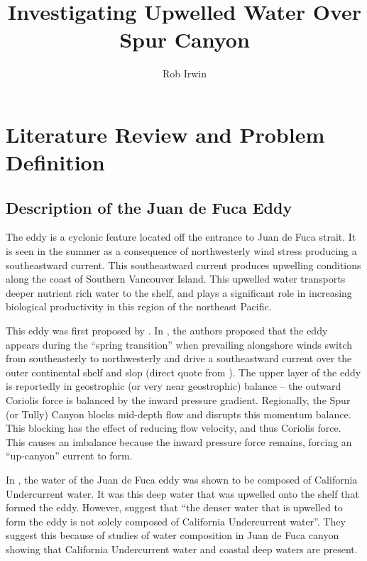 \documentclass[12pt]{extreport}
\title{Investigating Upwelled Water Over Spur Canyon}
\author{Rob Irwin}
\begin{document}
\maketitle

\chapter{Literature Review and Problem Definition}

\section{Description of the Juan de Fuca Eddy}

The eddy is a cyclonic feature located off the entrance to Juan de Fuca strait. It is seen in the summer as a consequence of northwesterly wind stress producing a southeastward current. This southeastward current produces upwelling conditions along the coast of Southern Vancouver Island. This upwelled water transports deeper nutrient rich water to the shelf, and plays a significant role in increasing biological productivity in this region of the northeast Pacific.

This eddy was first proposed by \cite{tully1941surface}. In 
\cite{freeland1982topographically}
, the authors proposed that the eddy appears during the ``spring transition'' when prevailing alongshore winds switch from southeasterly to northwesterly and drive a southeastward current over the outer continental shelf and slop (direct quote from \cite{foreman2008modeling}). The upper layer of the eddy is reportedly in geostrophic (or very near geostrophic) balance -- the outward Coriolis force is balanced by the inward pressure gradient. Regionally, the Spur (or Tully) Canyon blocks mid-depth flow and disrupts this momentum balance. This blocking has the effect of reducing flow velocity, and thus Coriolis force. This causes an imbalance because the inward pressure force remains, forcing an ``up-canyon'' current to form.

In \cite{freeland1982topographically}, the water of the Juan de Fuca eddy was shown to be composed of California Undercurrent water. It was this deep water that was upwelled onto the shelf that formed the eddy. However, \cite{foreman2008modeling} suggest that ``the denser water that is upwelled to form the eddy is not solely composed of California Undercurrent water''. They suggest this because of studies of water composition in Juan de Fuca canyon showing that California Undercurrent water and coastal deep waters are present.
\end{document}
